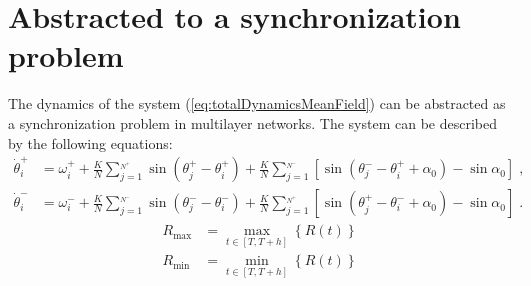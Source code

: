 \documentclass{article}
\begin{document}
\newpage
\section{Abstracted to a synchronization problem}

The dynamics of the system (\ref{eq:totalDynamicsMeanField}) can be abstracted as a synchronization problem in multilayer networks. The system can be described by the following equations:
\begin{subequations}
    \begin{align}
        \dot{\theta}_{i}^{+}&=\omega _{i}^{+}+\frac{K}{N}\sum_{j=1}^{_{N^+}}{\sin \left( \theta _{j}^{+}-\theta _{i}^{+} \right)}+\frac{K}{N}\sum_{j=1}^{_{N^{-}}}{\left[ \sin \left( \theta _{j}^{-}-\theta _{i}^{+}+\alpha _0 \right) -\sin\alpha _0 \right]}\;,\\
        \dot{\theta}_{i}^{-}&=\omega _{i}^{-}+\frac{K}{N}\sum_{j=1}^{_{N^-}}{\sin \left( \theta _{j}^{-}-\theta _{i}^{-} \right)}+\frac{K}{N}\sum_{j=1}^{_{N^{+}}}{\left[ \sin \left( \theta _{j}^{+}-\theta _{i}^{-}+\alpha _0 \right) -\sin\alpha _0 \right]}\;.
    \end{align}
\end{subequations}
\begin{subequations}
    \begin{align}
        R_{\max}&=\max_{t\in \left[ T,T+h \right]} \left\{ R\left( t \right) \right\} 
        \\
        R_{\min}&=\min_{t\in \left[ T,T+h \right]} \left\{ R\left( t \right) \right\} 
    \end{align}
\end{subequations}

\end{document}
